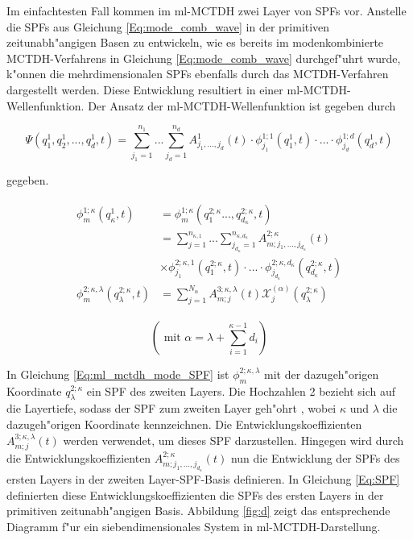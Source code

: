 Im einfachtesten Fall kommen im ml-MCTDH zwei Layer von SPFs vor.
Anstelle die SPFs aus Gleichung \ref{Eq:mode_comb_wave} in der primitiven zeitunabh"angigen Basen zu entwickeln, wie es bereits
im modenkombinierte MCTDH-Verfahrens in Gleichung \ref{Eq:mode_comb_wave} durchgef"uhrt wurde,
k"onnen die mehrdimensionalen SPFs ebenfalls durch das MCTDH-Verfahren dargestellt werden.
Diese Entwicklung resultiert in einer ml-MCTDH-Wellenfunktion. 
Der Ansatz der ml-MCTDH-Wellenfunktion ist gegeben durch 

\begin{equation}
  \Psi(q^{1}_{1},q^{1}_{2},..., q^{1}_{d}, t)=\sum^{n_{1}}_{j_{1}=1} ... \sum^{n_{d}}_{j_{d}=1} A^{1}_{j_{1}, ..., j_{d}}(t)
  \cdot \phi^{1;1}_{j_{1}}(q^1_{1}, t) \cdot ... \cdot \phi^{1;d}_{j_{d}}(q^1_{d}, t)
  \label{Eq:ml_mctdh_wave}
  \end{equation}

gegeben.

\begin{align}
  \begin{split}
 \phi^{1;\kappa}_{m} (q^1_{\kappa}, t) & =  \phi^{1;\kappa}_{m} (q^{2;\kappa}_1..., q^{2;\kappa}_{d_{\kappa}},t)\\
 & = \sum^{n_{\kappa,1}}_{j=1} ... \sum^{n_{\kappa,d_\kappa}}_{j_{d_\kappa}=1} A^{2;\kappa}_{m;j_1,...,j_{d_\kappa}}(t) \\
 & \times \phi^{2;\kappa,1}_{j_1} (q^{2;\kappa}_{1}, t) \cdot ... \cdot
 \phi^{2;\kappa,d_\kappa}_{j_{d_\kappa}} (q^{2;\kappa}_{d_\kappa}, t)
\\
 \phi^{2;\kappa, \lambda}_{m} (q^{2;\kappa}_{\lambda}, t)&= \sum^{N_{\alpha}}_{j=1} A^{3;\kappa, \lambda}_{m;j}(t)
 \mathcal{X}^{(\alpha)}_{j}(q^{2;\kappa}_\lambda)
 \label{Eq:ml_mctdh_mode_SPF}
  \end{split}
 \end{align}

 \begin{equation}
  \left( \text{ mit } \alpha = \lambda + \sum^{\kappa - 1}_{i=1}d_i \right)
 \end{equation}

In Gleichung \ref{Eq:ml_mctdh_mode_SPF} ist $ \phi^{2;\kappa, \lambda}_{m}  $ 
mit der dazugeh"origen Koordinate $q^{2;\kappa}_\lambda$ ein SPF des zweiten Layers.
Die Hochzahlen 2 bezieht sich auf die Layertiefe, sodass der SPF zum zweiten Layer geh"ohrt
, wobei $\kappa$ und $\lambda$ die dazugeh"origen Koordinate kennzeichnen.
Die Entwicklungskoeffizienten $A^{3;\kappa, \lambda}_{m;j}(t) $ werden verwendet, um dieses SPF darzustellen.
Hingegen wird durch die Entwicklungskoeffizienten $A^{2;\kappa}_{m;j_1,...,j_{d_\kappa}}(t)$ nun die Entwicklung der SPFs des ersten Layers
in der zweiten Layer-SPF-Basis definieren.
In Gleichung \ref{Eq:SPF} definierten diese Entwicklungskoeffizienten die SPFs des ersten Layers in der primitiven zeitunabh"angigen Basis.
Abbildung \ref{fig:d} zeigt das entsprechende Diagramm f"ur ein siebendimensionales System in ml-MCTDH-Darstellung.

